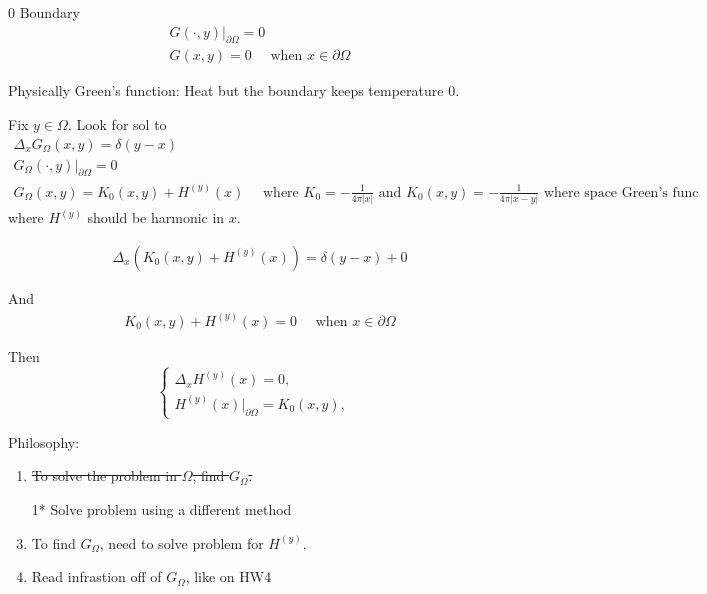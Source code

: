 \documentclass[11pt]{article}
\begin{document}
0 Boundary
\begin{align*}
    G(\cdot ,y)|_{\partial \Omega} = 0\\
    G(x,y) = 0 \quad \text{ when }x \in \partial \Omega
\end{align*}

Physically Green's function: Heat but the boundary keeps temperature 0.

Fix $y \in \Omega$. Look for sol to
\begin{equation}
    \begin{aligned}
    \Delta_{x}G_{\Omega}(x,y) = \delta(y-x) \\
    G_{\Omega}(\cdot ,y)|_{\partial \Omega} = 0\\
    G_{\Omega}(x,y) = K_0(x,y) + H^{(y)}(x)\quad \text{ where }K_0 = -\frac{1}{4\pi |x|} \text{ and }
        K_0(x,y) = -\frac{1}{4\pi|x-y|} \text{ where space Green's func}
    \end{aligned}
\end{equation}
where $H^{(y)}$ should be harmonic in $x$.

\begin{align*}
    \Delta_{x}(K_0(x,y) + H^{(y)}(x)) = \delta(y-x) + 0
\end{align*}

And 
\begin{align*}
    K_0(x,y) + H^{(y)}(x) = 0 \quad \text{ when }x \in \partial \Omega
\end{align*}

Then 
\begin{equation}
    \begin{cases} 
        \Delta_{x}H^{(y)}(x) = 0, &  \\ 
        H^{(y)}(x)|_{\partial \Omega} = K_0(x,y), &   
    \end{cases}
\end{equation}

Philosophy:
\begin{enumerate}
    \item  \sout{To solve the problem in $\Omega$, find $G_{\Omega}$.}
    \item [1*] Solve problem using a different method
    \item To find $G_{\Omega}$, need to solve problem for $H^{(y)}$.
    \item Read infrastion off of $G_{\Omega}$, like on HW4
\end{enumerate}
\end{document}
